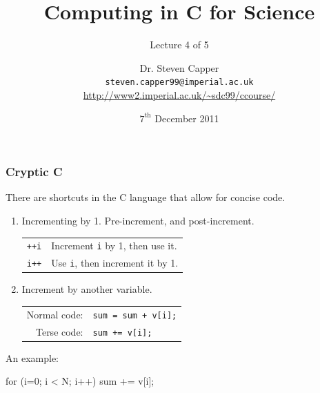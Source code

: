 \documentclass[table]{beamer}
\newif\ifschigh\schighfalse
\newcommand{\kw}[1]{\ifschigh\textcolor{red}{#1}\else\textcolor{keyword}{#1}\fi}
\let\oldurl=\url
\renewcommand{\url}[1]{\textcolor{blue}{\oldurl{#1}}}
\begin{document}

\title[C for Science - Lecture 4]{Computing in C for Science}
\subtitle{Lecture 4 of 5}

\author[Steven Capper]{Dr. Steven Capper \\ {\tt steven.capper99@imperial.ac.uk}\\
\url{http://www2.imperial.ac.uk/~sdc99/ccourse/}}

\date{$7^\text{th}$ December 2011 }

\subject{C for Science} %
{
\begin{frame}
  \titlepage
\end{frame}
}

\begin{frame}[fragile]
\frametitle{Cryptic C}
There are shortcuts in the C language that allow for concise code.
\begin{enumerate}
\item Incrementing by 1. Pre-increment, and post-increment.\\
\begin{tabular}{l l}
\tt ++i& Increment {\tt i} by 1, then use it.\\
\tt i++& Use {\tt i}, then increment it by 1.
\end{tabular}
\item Increment by another variable.\\
\begin{tabular}{r l}
Normal code:&\tt sum = sum + v[i];\\
Terse code:&\tt sum += v[i];
\end{tabular}
\end{enumerate}
An example:\\
\begin{semiverbatim}
   \kw{for} (i=0; i < N; i++)
      sum += v[i];
\end{semiverbatim}
\end{frame}
\end{document}
